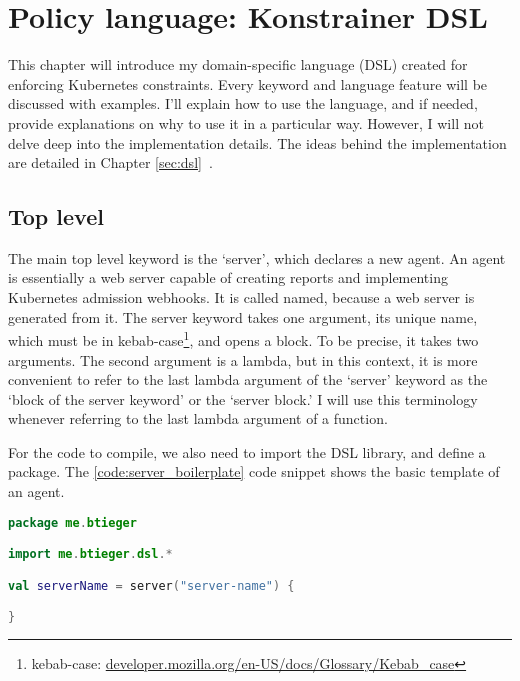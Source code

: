 \setlength{\parindent}{0pt}
\setlength{\parskip}{0.6em}

\chapter[Policy language]{Policy language: Konstrainer DSL}
\label{chap:konst_dsl}

This chapter will introduce my domain-specific language (DSL) created for enforcing Kubernetes constraints. Every keyword and language feature will be discussed with examples. I'll explain how to use the language, and if needed, provide explanations on why to use it in a particular way. However, I will not delve deep into the implementation details. The ideas behind the implementation are detailed in Chapter \ref{sec:dsl}~.

\section{Top level}

The main top level keyword is the `server', which declares a new agent. An agent is essentially a web server capable of creating reports and implementing Kubernetes admission webhooks. It is called named, because a web server is generated from it. The server keyword takes one argument, its unique name, which must be in kebab-case\footnote{kebab-case: \url{developer.mozilla.org/en-US/docs/Glossary/Kebab_case}}, and opens a block. To be precise, it takes two arguments. The second argument is a lambda, but in this context, it is more convenient to refer to the last lambda argument of the `server' keyword as the `block of the server keyword' or the `server block.' I will use this terminology whenever referring to the last lambda argument of a function.

For the code to compile, we also need to import the DSL library, and define a package. The \ref{code:server_boilerplate} code snippet shows the basic template of an agent.

\begin{lstlisting}[caption={Template of a DSL file},language=Kotlin,label=code:server_boilerplate]
package me.btieger

import me.btieger.dsl.*

val serverName = server("server-name") {

}
\end{lstlisting}

